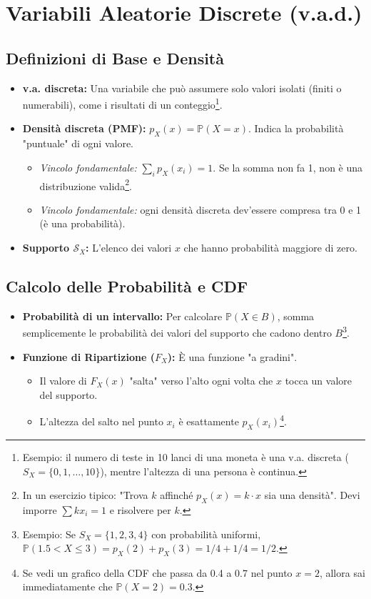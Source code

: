 \documentclass[12pt]{extarticle} %
\begin{document}
\newpage
\section{Variabili Aleatorie Discrete (v.a.d.)}

\subsection{Definizioni di Base e Densità}
\begin{itemize}
    \item \textbf{v.a. discreta:} Una variabile che può assumere solo valori isolati (finiti o numerabili), come i risultati di un conteggio\footnote{Esempio: il numero di teste in 10 lanci di una moneta è una v.a. discreta ($S_X = \{0, 1, \dots, 10\}$), mentre l'altezza di una persona è continua.}.
    \item \textbf{Densità discreta (PMF):} $p_X(x) = \mathbb{P}(X = x)$. Indica la probabilità "puntuale" di ogni valore.
    \begin{itemize}
        \item \textit{Vincolo fondamentale:} $\sum_{i} p_X(x_i) = 1$. Se la somma non fa 1, non è una distribuzione valida\footnote{In un esercizio tipico: "Trova $k$ affinché $p_X(x) = k \cdot x$ sia una densità". Devi imporre $\sum k x_i = 1$ e risolvere per $k$.}.
        \item \textit{Vincolo fondamentale:} ogni densità discreta dev'essere compresa tra 0 e 1 (è una probabilità).
    \end{itemize}
    \item \textbf{Supporto $\mathcal{S}_X$:} L'elenco dei valori $x$ che hanno probabilità maggiore di zero.
\end{itemize}

\subsection{Calcolo delle Probabilità e CDF}
\begin{itemize}
    \item \textbf{Probabilità di un intervallo:} Per calcolare $\mathbb{P}(X \in B)$, somma semplicemente le probabilità dei valori del supporto che cadono dentro $B$\footnote{Esempio: Se $S_X = \{1, 2, 3, 4\}$ con probabilità uniformi, $\mathbb{P}(1.5 < X \le 3) = p_X(2) + p_X(3) = 1/4 + 1/4 = 1/2$.}.
    \item \textbf{Funzione di Ripartizione ($F_X$):} È una funzione "a gradini".
    \begin{itemize}
        \item Il valore di $F_X(x)$ "salta" verso l'alto ogni volta che $x$ tocca un valore del supporto.
        \item L'altezza del salto nel punto $x_i$ è esattamente $p_X(x_i)$\footnote{Se vedi un grafico della CDF che passa da 0.4 a 0.7 nel punto $x=2$, allora sai immediatamente che $\mathbb{P}(X=2) = 0.3$.}.
    \end{itemize}
\end{itemize}
\end{document}
